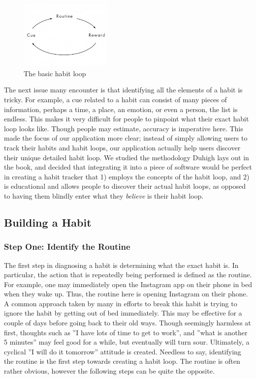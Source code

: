 \begin{figure}[h]
\centering
\includegraphics[width=0.4\textwidth]{images/habitloopbasic.jpg}
\caption{The basic habit loop}
\end{figure}
\newline The next issue many encounter is that identifying all the elements of a habit is tricky. For example, a cue related to a habit can consist of many pieces of information, perhaps a time, a place, an emotion, or even a person, the list is endless. This makes it very difficult for people to pinpoint what their exact habit loop looks like. Though people may estimate, accuracy is imperative here. This made the focus of our application more clear; instead of simply allowing users to track their habits and habit loops, our application actually help users discover their unique detailed habit loop.
\newline \newline
We studied the methodology Duhigh lays out in the book, and decided that integrating it into a piece of software would be perfect in creating a habit tracker that 1) employs the concepts of the habit loop, and 2) is educational and allows people to discover their actual habit loops, as opposed to having them blindly enter what they \textit{believe} is their habit loop.

\subsection{Building a Habit}
\subsubsection*{Step One: Identify the Routine}
The first step in diagnosing a habit is determining what the exact habit is. In particular, the action that is repeatedly being performed is defined as the routine. For example, one may immediately open the Instagram app on their phone in bed when they wake up. Thus, the routine here is opening Instagram on their phone. A common approach taken by many in efforts to break this habit is trying to ignore the habit by getting out of bed immediately. This may be effective for a couple of days before going back to their old ways. Though seemingly harmless at first, thoughts such as ”I have lots of time to get to work”, and ”what is another 5 minutes” may feel good for a while, but eventually will turn sour. Ultimately, a cyclical ”I will do it tomorrow” attitude is created.
\newline \newline
Needless to say, identifying the routine is the first step towards creating a habit loop. The routine is often rather obvious, however the following steps can be quite the opposite.

